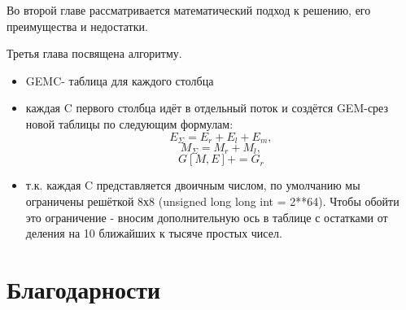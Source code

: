 \documentclass[utf8, babel, sor, jor, amsmath, amssymb, reprint]{elsarticle} %
\begin{document}
	Во второй главе рассматривается математический подход к решению, его преимущества и недостатки.
	
	Третья глава посвящена алгоритму.
	\begin{itemize}
		\item GEMC- таблица для каждого столбца
		\item каждая C первого столбца идёт в отдельный поток и создётся GEM-срез новой таблицы по следующим формулам:
		\begin{equation*}
			E_\Sigma = E_r + E_l + E_m,
		\end{equation*}
		\begin{equation*}
			M_\Sigma = M_r + M_l,
		\end{equation*}
		\begin{equation*}
			G[M, E] += G_r
		\end{equation*}
		\item т.к. каждая C представляется двоичным числом, по умолчанию мы ограничены решёткой 8х8 (unsigned long long int = 2**64). Чтобы обойти это ограничение - вносим дополнительную ось в таблице с остатками от деления на 10 ближайших к тысяче простых чисел.
	\end{itemize}
	
	
	\section{Благодарности}
	
	
	
	
	
	
\end{document}
